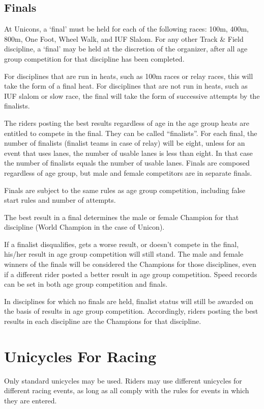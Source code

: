 \subsection{Finals}
At Unicons, a `final' must be held for each of the following races: 100m, 400m, 800m, One Foot, Wheel Walk, and IUF Slalom. 
For any other Track \& Field discipline, a `final' may be held at the discretion of the organizer, after all age group competition for that discipline has been completed.

For disciplines that are run in heats, such as 100m races or relay races, this will take the form of a final heat. 
For disciplines that are not run in heats, such as IUF slalom or slow race, the final will take the form of successive attempts by the finalists.

The riders posting the best results regardless of age in the age group heats are entitled to compete in the final.
They can be called ``finalists''.
For each final, the number of finalists (finalist teams in case of relay) will be eight, unless for an event that uses lanes, the number of usable lanes is less than eight.
In that case the number of finalists equals the number of usable lanes.
Finals are composed regardless of age group, but male and female competitors are in separate finals.

Finals are subject to the same rules as age group competition, including false start rules and number of attempts.

The best result in a final determines the male or female Champion for that discipline (World Champion in the case of Unicon).

If a finalist disqualifies, gets a worse result, or doesn't compete in the final, his/her result in age group competition will still stand.
The male and female winners of the finals will be considered the Champions for those disciplines, even if a different rider posted a better result in age group competition.
Speed records can be set in both age group competition and finals.

In disciplines for which no finals are held, finalist status will still be awarded on the basis of results in age group competition.
Accordingly, riders posting the best results in each discipline are the Champions for that discipline.

\section{Unicycles For Racing}
Only standard unicycles may be used.
Riders may use different unicycles for different racing events, as long as all comply with the rules for events in which they are entered.

